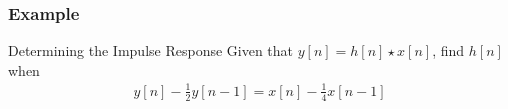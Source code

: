\documentclass[mathserif,9pt,handout]{beamer}
\begin{document}
\begin{frame}\frametitle{Example}\small
  \begin{exampleblock}{Determining the Impulse Response}
  Given that $y[n] = h[n]\star x[n]$, find $h[n]$ when 
  \begin{align}
    y[n] - \frac{1}{2}y[n - 1] = x[n] - \frac{1}{4} x[n - 1] \nonumber 
  \end{align}
  \end{exampleblock}
  \vspace{1em}
  
  \begin{center}
  \end{center}
\end{frame}
\end{document}
